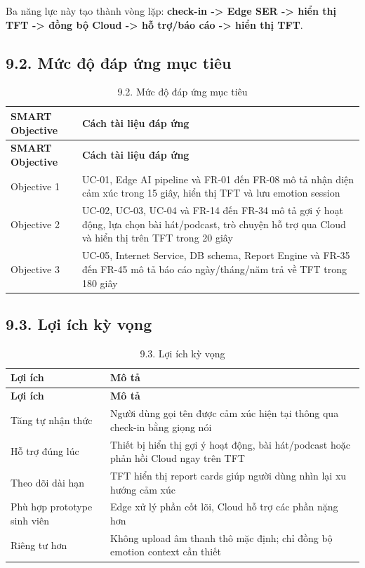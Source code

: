 \documentclass[12pt,a4paper]{article}
\begin{document}
Ba năng lực này tạo thành vòng lặp: \textbf{check-in -> Edge SER -> hiển thị TFT -> đồng bộ Cloud -> hỗ trợ/báo cáo -> hiển thị TFT}.


\subsection*{9.2. Mức độ đáp ứng mục tiêu}

\begin{center}
\begin{longtable}{|P{0.30\textwidth}|P{0.62\textwidth}|}
\caption{9.2. Mức độ đáp ứng mục tiêu}\\
\hline
\textbf{SMART Objective} & \textbf{Cách tài liệu đáp ứng} \\
\hline
\endfirsthead
\hline
\textbf{SMART Objective} & \textbf{Cách tài liệu đáp ứng} \\
\hline
\endhead
Objective 1 & UC-01, Edge AI pipeline và FR-01 đến FR-08 mô tả nhận diện cảm xúc trong 15 giây, hiển thị TFT và lưu emotion session \\
\hline
Objective 2 & UC-02, UC-03, UC-04 và FR-14 đến FR-34 mô tả gợi ý hoạt động, lựa chọn bài hát/podcast, trò chuyện hỗ trợ qua Cloud và hiển thị trên TFT trong 20 giây \\
\hline
Objective 3 & UC-05, Internet Service, DB schema, Report Engine và FR-35 đến FR-45 mô tả báo cáo ngày/tháng/năm trả về TFT trong 180 giây \\
\hline
\end{longtable}
\end{center}

\subsection*{9.3. Lợi ích kỳ vọng}

\begin{center}
\begin{longtable}{|P{0.30\textwidth}|P{0.62\textwidth}|}
\caption{9.3. Lợi ích kỳ vọng}\\
\hline
\textbf{Lợi ích} & \textbf{Mô tả} \\
\hline
\endfirsthead
\hline
\textbf{Lợi ích} & \textbf{Mô tả} \\
\hline
\endhead
Tăng tự nhận thức & Người dùng gọi tên được cảm xúc hiện tại thông qua check-in bằng giọng nói \\
\hline
Hỗ trợ đúng lúc & Thiết bị hiển thị gợi ý hoạt động, bài hát/podcast hoặc phản hồi Cloud ngay trên TFT \\
\hline
Theo dõi dài hạn & TFT hiển thị report cards giúp người dùng nhìn lại xu hướng cảm xúc \\
\hline
Phù hợp prototype sinh viên & Edge xử lý phần cốt lõi, Cloud hỗ trợ các phần nặng hơn \\
\hline
Riêng tư hơn & Không upload âm thanh thô mặc định; chỉ đồng bộ emotion context cần thiết \\
\hline
\end{longtable}
\end{center}
\end{document}
